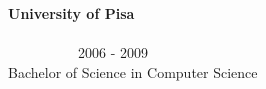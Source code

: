 \begin{resume}
        \textbf{University of Pisa} \ \ \ \ \ \ \ \ \ \ \ \ \ \ \ \ \ \ \ \ \ \ \ \ \ \ \ \ \ \ \ \ \ \ \ \ \ \ \ \ \ \ \ \ \ \ \ \ \ \ \ \ \ \ \ \ \ \ \ \ \ \ \ \ \ \ \ \ \ \ \ \ \ \ \ \ \ \ \ \ \ \ 2006 - 2009 \\
        Bachelor of Science in Computer Science





    \end{resume}
